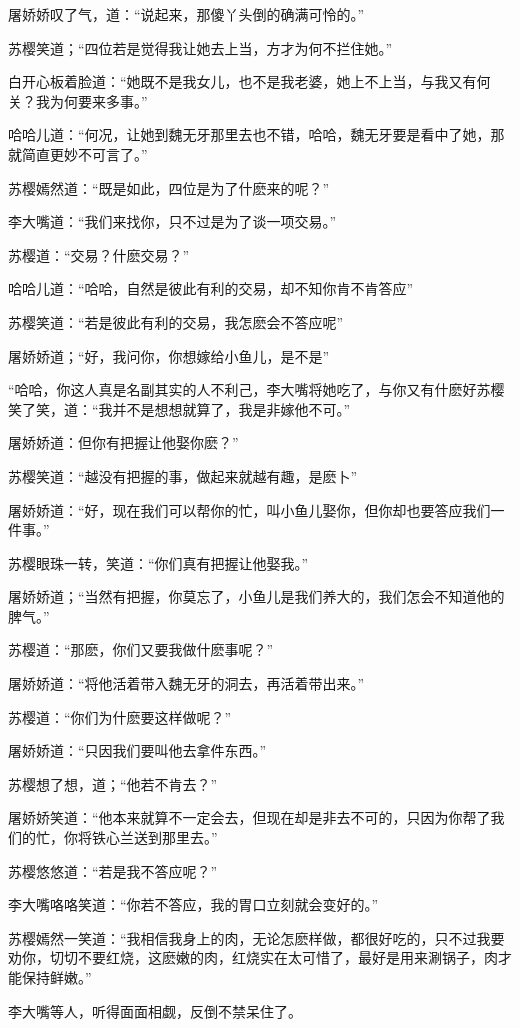 \documentclass[12pt,oneside]{book}
\begin{document}
屠娇娇叹了气，道：``说起来，那傻丫头倒的确满可怜的。''

苏樱笑道；``四位若是觉得我让她去上当，方才为何不拦住她。''

白开心板着脸道：``她既不是我女儿，也不是我老婆，她上不上当，与我又有何关？我为何要来多事。''

哈哈儿道：``何况，让她到魏无牙那里去也不错，哈哈，魏无牙要是看中了她，那就简直更妙不可言了。''

苏樱嫣然道：``既是如此，四位是为了什麽来的呢？''

李大嘴道：``我们来找你，只不过是为了谈一项交易。''

苏樱道：``交易？什麽交易？''

哈哈儿道：``哈哈，自然是彼此有利的交易，却不知你肯不肯答应''

苏樱笑道：``若是彼此有利的交易，我怎麽会不答应呢''

屠娇娇道；``好，我问你，你想嫁给小鱼儿，是不是''

``哈哈，你这人真是名副其实的人不利己，李大嘴将她吃了，与你又有什麽好苏樱笑了笑，道：``我并不是想想就算了，我是非嫁他不可。''

屠娇娇道：但你有把握让他娶你麽？''

苏樱笑道：``越没有把握的事，做起来就越有趣，是麽卜''

屠娇娇道：``好，现在我们可以帮你的忙，叫小鱼儿娶你，但你却也要答应我们一件事。''

苏樱眼珠一转，笑道：``你们真有把握让他娶我。''

屠娇娇道；``当然有把握，你莫忘了，小鱼儿是我们养大的，我们怎会不知道他的脾气。''

苏樱道：``那麽，你们又要我做什麽事呢？''

屠娇娇道：``将他活着带入魏无牙的洞去，再活着带出来。''

苏樱道：``你们为什麽要这样做呢？''

屠娇娇道：``只因我们要叫他去拿件东西。''

苏樱想了想，道；``他若不肯去？''

屠娇娇笑道：``他本来就算不一定会去，但现在却是非去不可的，只因为你帮了我们的忙，你将铁心兰送到那里去。''

苏樱悠悠道：``若是我不答应呢？''

李大嘴咯咯笑道：``你若不答应，我的胃口立刻就会变好的。''

苏樱嫣然一笑道：``我相信我身上的肉，无论怎麽样做，都很好吃的，只不过我要劝你，切切不要红烧，这麽嫩的肉，红烧实在太可惜了，最好是用来涮锅子，肉才能保持鲜嫩。''

李大嘴等人，听得面面相觑，反倒不禁呆住了。
\end{document}
